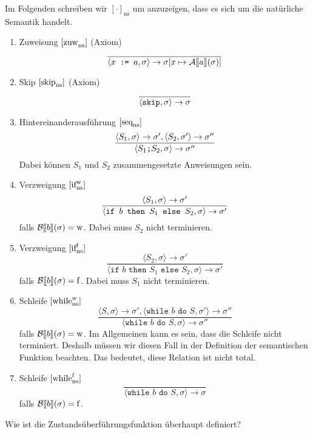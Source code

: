 Im Folgenden schreiben wir $[\cdot]_{\text{ns}}$ um anzuzeigen, dass es sich um die natürliche Semantik handelt.

\begin{enumerate}
    \item Zuweisung $\infruleNs{zuw}$ (Axiom)
    \[
    \frac{}{\strans{x \texttt{ := } a}{\sigma}{\sigma[x \mapsto \Asem{a}(\sigma)]}}
    \]

    \item Skip $\infruleNs{skip}$ (Axiom)
    \[
    \frac{}{\strans{\texttt{skip}}{\sigma}{\sigma}}
    \]

    \item Hintereinanderausführung $\infruleNs{seq}$
    \[
    \frac{\strans{S_1}{\sigma}{\sigma'}, \strans{S_2}{\sigma'}{\sigma''}}{\strans{S_1 \texttt{;} S_2}{\sigma}{\sigma''}}
    \]
    Dabei können $S_1$ und $S_2$ zusammengesetzte Anweisungen sein.

    \item Verzweigung $\infruleNs[\true]{if}$
    \[
    \frac{\strans{S_1}{\sigma}{\sigma'}}{\strans{\texttt{if } b \texttt{ then } S_1 \texttt{ else } S_2}{\sigma}{\sigma'}}
    \]
    falls $\Bsem{b}(\sigma) = \true$. Dabei muss $S_2$ nicht terminieren.

    \item Verzweigung $\infruleNs[\false]{if}$
    \[
    \frac{\langle S_2, \sigma \rangle \to \sigma'}{\langle \texttt{if } b \texttt{ then } S_1 \texttt{ else } S_2, \sigma \rangle \to \sigma'}
    \]
    falls $\Bsem{b}(\sigma) = \false$. Dabei muss $S_1$ nicht terminieren.

    \item Schleife $\infruleNs[\true]{while}$
    \[
    \frac{\langle S, \sigma \rangle \to \sigma', \langle \texttt{while } b \texttt{ do } S, \sigma' \rangle \to \sigma''}{\langle \texttt{while } b \texttt{ do } S, \sigma \rangle \to \sigma''}
    \]
    falls $\Bsem{b}(\sigma) = \true$. Im Allgemeinen kann es sein, dass die Schleife nicht terminiert. Deshalb müssen wir diesen Fall in der Definition der semantischen Funktion beachten. Das bedeutet, diese Relation ist nicht total.

    \item Schleife $\infruleNs[\false]{while}$
    \[
    \frac{\text{ }}{\langle \texttt{while } b \texttt{ do } S, \sigma \rangle \to \sigma}
    \]
    falls $\Bsem{b}(\sigma) = \false$.
\end{enumerate}

\par\bigskip
\par\bigskip
Wie ist die Zustandsüberführungsfunktion überhaupt definiert?

